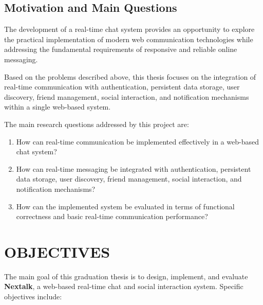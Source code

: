 \documentclass[12pt, a4paper]{article}
\begin{document}
\subsection{Motivation and Main Questions}

The development of a real-time chat system provides an opportunity to explore the practical implementation of modern web communication technologies while addressing the fundamental requirements of responsive and reliable online messaging.

Based on the problems described above, this thesis focuses on the integration of real-time communication with authentication, persistent data storage, user discovery, friend management, social interaction, and notification mechanisms within a single web-based system.

The main research questions addressed by this project are:

\begin{enumerate}
    \item How can real-time communication be implemented effectively in a web-based chat system?

    \item How can real-time messaging be integrated with authentication, persistent data storage, user discovery, friend management, social interaction, and notification mechanisms?

    \item How can the implemented system be evaluated in terms of functional correctness and basic real-time communication performance?
\end{enumerate}

\newpage
\section{OBJECTIVES}

The main goal of this graduation thesis is to design, implement, and
evaluate \textbf{Nextalk}, a web-based real-time chat and social
interaction system. Specific objectives include:
\end{document}
